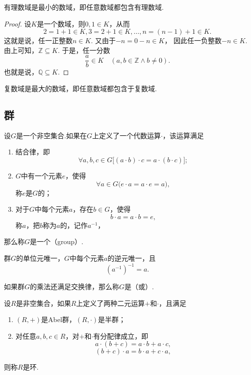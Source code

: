 \begin{theorem}
有理数域是最小的数域，即任意数域都包含有理数域.
\begin{proof}
设\(K\)是一个数域，则\(0,1 \in K\)，从而
\[
2 = 1 + 1 \in K,
3 = 2 + 1 \in K,
\dotsc,
n = (n-1) + 1 \in K.
\]
这就是说，任一正整数\(n \in K\).
又由于\(-n = 0 - n \in K\)，%
因此任一负整数\(-n \in K\).
由上可知，\(\mathbb{Z} \subseteq K\).
于是，任一分数\[
\frac{a}{b} \in K \quad(a,b\in\mathbb{Z} \land b\neq0).
\]
也就是说，\(\mathbb{Q} \subseteq K\).
\end{proof}
\end{theorem}

\begin{theorem}
复数域是最大的数域，即任意数域都包含于复数域.
\end{theorem}


\subsection{群}
\begin{definition}
设\(G\)是一个非空集合.如果在\(G\)上定义了一个代数运算\(\cdot\)，该运算满足
\begin{enumerate}
\item 结合律，即\[
\forall a,b,c \in G \bigl[ (a \cdot b) \cdot c = a \cdot (b \cdot c) \bigr];
\]
\item \(G\)中有一个元素\(e\)，使得\[
\forall a \in G \bigl( e \cdot a = a \cdot e = a \bigr),
\]称\(e\)是\(G\)的；
\item 对于\(G\)中每个元素\(a\)，存在\(b \in G\)，使得\[
b \cdot a = a \cdot b = e,
\]称\(a\)，把\(b\)称为\(a\)的，记作\(a^{-1}\)，%
\end{enumerate}
那么称\(G\)是一个（group）.
\end{definition}

\begin{property}
群\(G\)的单位元唯一，\(G\)中每个元素\(a\)的逆元唯一，且\[
(a^{-1})^{-1} = a.
\]
\end{property}

\begin{definition}
如果群\(G\)的乘法还满足交换律，那么称\(G\)是（或）.
\end{definition}

\begin{theorem}
设\(R\)是非空集合，如果\(R\)上定义了两种二元运算\(+\)和\(\cdot\)，且满足\begin{enumerate}
\item \((R,+)\)是Abel群，\((R,\cdot)\)是半群；
\item 对任意\(a,b,c \in R\)，对\(+\)和\(\cdot\)有分配律成立，即\[
a \cdot (b + c) = a \cdot b + a \cdot c,
\]\[
(b + c) \cdot a = b \cdot a + c \cdot a,
\]
\end{enumerate}则称\(R\)是环.
\end{theorem}

